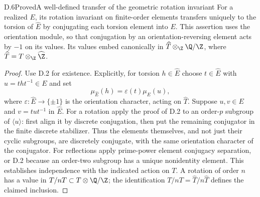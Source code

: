 \begin{claim}{D.6}{Proved}{A well-defined transfer of the geometric rotation invariant}
For a realized $E$, its rotation invariant on finite-order elements transfers uniquely to the torsion of $\widehat E$ by conjugating each torsion element into $E$. This assertion uses the orientation module, so that conjugation by an orientation-reversing element acts by $-1$ on its values. Its values embed canonically in $\widehat T\otimes_{\Z}\Q/\Z$, where $\widehat T=T\otimes_{\Z}\widehat\Z$.
\end{claim}
\begin{proof}
Use D.2 for existence. Explicitly, for torsion $h\in\widehat E$ choose $t\in\widehat E$ with $u=tht^{-1}\in E$ and set
\[
 \mu_{\widehat E}(h)=\varepsilon(t)\mu_E(u),
\]
where $\varepsilon:\widehat E\to\{\pm1\}$ is the orientation character, acting on $\widehat T$. Suppose $u,v\in E$ and $v=tut^{-1}$ in $\widehat E$. For a rotation apply the proof of D.2 to an order-$p$ subgroup of $\langle u\rangle$: first align it by discrete conjugation, then put the remaining conjugator in the finite discrete stabilizer. Thus the elements themselves, and not just their cyclic subgroups, are discretely conjugate, with the same orientation character of the conjugator. For reflections apply prime-power element conjugacy separation, or D.2 because an order-two subgroup has a unique nonidentity element. This establishes independence with the indicated action on $T$. A rotation of order $n$ has a value in $T/nT\subset T\otimes\Q/\Z$; the identification $T/nT=\widehat T/n\widehat T$ defines the claimed inclusion.
\end{proof}

